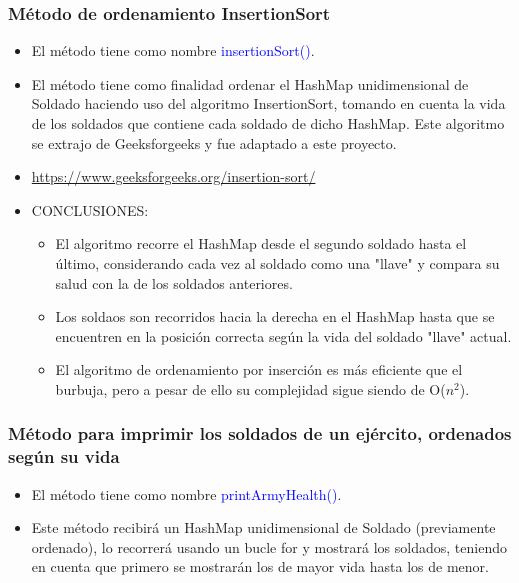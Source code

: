 \documentclass{article}
\begin{document}
\subsubsection{Método de ordenamiento InsertionSort}
\begin{itemize}
    \item El método tiene como nombre \textcolor{blue}{insertionSort()}.
    \item El método tiene como finalidad ordenar el HashMap unidimensional de Soldado haciendo uso del algoritmo InsertionSort, tomando en cuenta la vida de los soldados que contiene cada soldado de dicho HashMap. Este algoritmo se extrajo de Geeksforgeeks y fue adaptado a este proyecto.
    \item \href{https://www.geeksforgeeks.org/insertion-sort/}{https://www.geeksforgeeks.org/insertion-sort/}
    \item CONCLUSIONES:
    \begin{itemize}
        \item El algoritmo recorre el HashMap desde el segundo soldado hasta el último, considerando cada vez al soldado como una "llave" y compara su salud con la de los soldados anteriores.
        \item Los soldaos son recorridos hacia la derecha en el HashMap hasta que se encuentren en la posición correcta según la vida del soldado "llave" actual. 
        \item El algoritmo de ordenamiento por inserción es más eficiente que el burbuja, pero a pesar de ello su complejidad sigue siendo de O($n^2$).
    \end{itemize}
\end{itemize}



\subsubsection{Método para imprimir los soldados de un ejército, ordenados según su vida}
\begin{itemize}
    \item El método tiene como nombre \textcolor{blue}{printArmyHealth()}.
    \item Este método recibirá un HashMap unidimensional de Soldado (previamente ordenado), lo recorrerá usando un bucle for y mostrará los soldados, teniendo en cuenta que primero se mostrarán los de mayor vida hasta los de menor.
\end{itemize}

\end{document}
